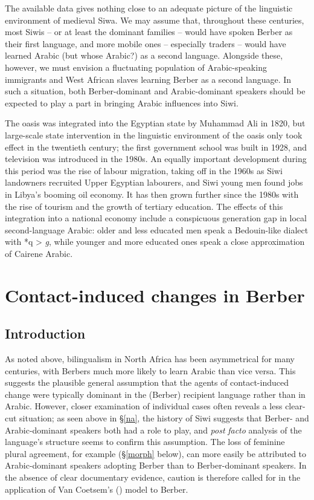 \documentclass[output=paper]{langsci/langscibook}
\begin{document}
The available data gives nothing close to an adequate picture of the linguistic environment of medieval Siwa. We may assume that, throughout these centuries, most Siwis – or at least the dominant families – would have spoken Berber as their first language, and more mobile ones – especially traders – would have learned Arabic (but whose Arabic?) as a second language. Alongside these, however, we must envision a fluctuating population of Arabic-speaking immigrants and West African slaves learning Berber as a second language. In such a situation, both Berber-dominant and Arabic-dominant speakers should be expected to play a part in bringing Arabic influences into Siwi.

The oasis was integrated into the Egyptian state by Muhammad Ali in 1820, but large-scale state intervention in the linguistic environment of the oasis only took effect in the twentieth century; the first government school was built in 1928, and television was introduced in the 1980s. An equally important development during this period was the rise of labour migration, taking off in the 1960s as Siwi landowners recruited Upper Egyptian labourers, and Siwi young men found jobs in Libya's booming oil economy. It has then grown further since the 1980s with the rise of tourism and the growth of tertiary education. The effects of this integration into a national economy include a conspicuous generation gap in local second-language Arabic: older and less educated men speak a Bedouin-like dialect with *q > \textit{g}, while younger and more educated ones speak a close approximation of Cairene Arabic.


 \section{Contact-induced changes in Berber}


 \subsection{Introduction}


As noted above, bilingualism in North Africa has been asymmetrical for many centuries, with Berbers much more likely to learn Arabic than vice versa. This suggests the plausible general assumption that the agents of contact-induced change were typically dominant in the (Berber) recipient language rather than in Arabic.  However, closer examination of individual cases often reveals a less clear-cut situation; as seen above in §\ref{na}, the history of Siwi suggests that Berber- and Arabic-dominant speakers both had a role to play, and \textit{post} \textit{facto} analysis of the language's structure seems to confirm this assumption.  The loss of feminine plural agreement, for example (§\ref{morph} below), can more easily be attributed to Arabic-dominant speakers adopting Berber than to Berber-dominant speakers.  In the absence of clear documentary evidence, caution is therefore called for in the application of Van Coetsem's (\citeyear{VanCoetsem1988,VanCoetsem2000}) model to Berber.
\end{document}
